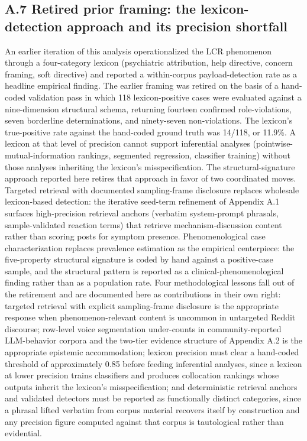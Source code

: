 \documentclass[11pt]{article}
\begin{document}
\subsection*{A.7 Retired prior framing: the lexicon-detection approach and its precision shortfall}

An earlier iteration of this analysis operationalized the LCR phenomenon through a four-category lexicon (psychiatric attribution, help directive, concern framing, soft directive) and reported a within-corpus payload-detection rate as a headline empirical finding. The earlier framing was retired on the basis of a hand-coded validation pass in which 118 lexicon-positive cases were evaluated against a nine-dimension structural schema, returning fourteen confirmed role-violations, seven borderline determinations, and ninety-seven non-violations. The lexicon's true-positive rate against the hand-coded ground truth was 14/118, or 11.9\%. A lexicon at that level of precision cannot support inferential analyses (pointwise-mutual-information rankings, segmented regression, classifier training) without those analyses inheriting the lexicon's misspecification. The structural-signature approach reported here retires that approach in favor of two coordinated moves. Targeted retrieval with documented sampling-frame disclosure replaces wholesale lexicon-based detection: the iterative seed-term refinement of Appendix A.1 surfaces high-precision retrieval anchors (verbatim system-prompt phrasals, sample-validated reaction terms) that retrieve mechanism-discussion content rather than scoring posts for symptom presence. Phenomenological case characterization replaces prevalence estimation as the empirical centerpiece: the five-property structural signature is coded by hand against a positive-case sample, and the structural pattern is reported as a clinical-phenomenological finding rather than as a population rate. Four methodological lessons fall out of the retirement and are documented here as contributions in their own right: targeted retrieval with explicit sampling-frame disclosure is the appropriate response when phenomenon-relevant content is uncommon in untargeted Reddit discourse; row-level voice segmentation under-counts in community-reported LLM-behavior corpora and the two-tier evidence structure of Appendix A.2 is the appropriate epistemic accommodation; lexicon precision must clear a hand-coded threshold of approximately 0.85 before feeding inferential analyses, since a lexicon at lower precision trains classifiers and produces collocation rankings whose outputs inherit the lexicon's misspecification; and deterministic retrieval anchors and validated detectors must be reported as functionally distinct categories, since a phrasal lifted verbatim from corpus material recovers itself by construction and any precision figure computed against that corpus is tautological rather than evidential.
\end{document}

